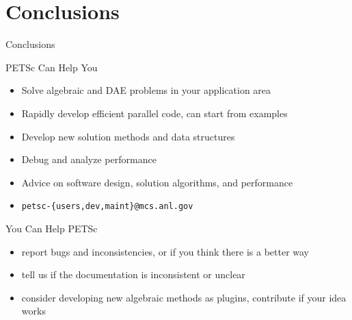 









%
%
\section{Conclusions}
\begin{frame}{Conclusions}
 
 \begin{block}{PETSc Can Help You}
  \begin{itemize}
   \item Solve algebraic and DAE problems in your application area
   \item Rapidly develop efficient parallel code, can start from examples
   \item Develop new solution methods and data structures
   \item Debug and analyze performance
   \item Advice on software design, solution algorithms, and performance
   \item \centering \texttt{petsc-\{users,dev,maint\}@mcs.anl.gov}

  \end{itemize}
 \end{block}

 \begin{block}{You Can Help PETSc}
  \begin{itemize}
   \item report bugs and inconsistencies, or if you think there is a better way
   \item tell us if the documentation is inconsistent or unclear
   \item consider developing new algebraic methods as plugins, contribute if your idea works
  \end{itemize}
 \end{block}

\end{frame}

